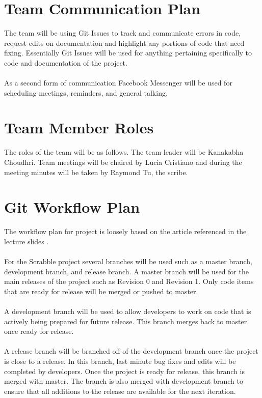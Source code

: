 \documentclass{article}
\begin{document}
\section{Team Communication Plan}
The team will be using Git Issues to track and communicate errors in code, request edits on documentation and highlight any portions of code that need fixing. Essentially Git Issues will be used for anything pertaining specifically to code and documentation of the project.\\ \\
As a second form of communication Facebook Messenger will be used for scheduling meetings, reminders, and general talking. 

\section{Team Member Roles}
The roles of the team will be as follows. The team leader will be Kanakabha Choudhri. Team meetings will be chaired by Lucia Cristiano and during the meeting minutes will be taken by Raymond Tu, the scribe.

\section{Git Workflow Plan}
The workflow plan for project is loosely based on the article referenced in the lecture slides \cite{driessen_2010}. \\ \\
For the Scrabble project several branches will be used such as a master branch, development branch, and release branch. A master branch will be used for the main releases of the project such as Revision 0 and Revision 1. Only code items that are ready for release will be merged or pushed to master.\\ \\
A development branch will be used to allow developers to work on code that is actively being prepared for future release. This branch merges back to master once ready for release. \\ \\
A release branch will be branched off of the development branch once the project is close to a release. In this branch, last minute bug fixes and edits will be completed by developers. Once the project is ready for release, this branch is merged with master. The branch is also merged with development branch to ensure that all additions to the release are available for the next iteration.
\end{document}
